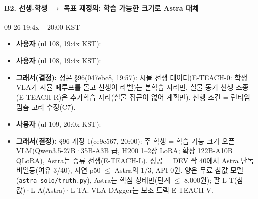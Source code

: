 \paragraph{B2. 선생-학생 $\rightarrow$ 목표 재정의: 학습 가능한 크기로 Astra 대체}
{\small 09-26 19:4x -- 20:00 KST}
\begin{itemize}
  \item \textbf{사용자} (ul 108, 19:4x KST): 
  \item \textbf{사용자} (ul 108, 19:4x KST): 
  \item \textbf{그래서(결정):} 정본 §96(047ebc8, 19:57): 시뮬 선생 데이터(E-TEACH-0: 학생 VLA가 시뮬 폐루프를 몰고 선생이 라벨)는 본학습 자리만, 실물 동기 선생 조종(E-TEACH-R)은 추가학습 자리(실물 접근이 없어 계획만). 선행 조건 = 런타임 멈춤 고리 수정(C7).
  \item \textbf{사용자} (ul 109, 20:0x KST): 
  \item \textbf{그래서(결정):} §96 개정 1(ce9c567, 20:00): 주 학생 = 학습 가능 크기 오픈 VLM(Qwen3.5-27B·35B-A3B 급, H200 1--2장 LoRA; 확장 122B-A10B QLoRA), Astra는 증류 선생(E-TEACH-L). 성공 = DEV 짝 40에서 Astra 단독 비열등(여유 3/40), 지연 p50 $\leq$ Astra의 1/3, API 0원. 양은 무료 참값 모델(\texttt{astra\_\allowbreak{}solo/\allowbreak{}truth.\allowbreak{}py}), Astra는 핵심 상태만(단계 $\leq$ 8,000원); 팔 L-T(참값)·L-A(Astra)·L-TA. VLA DAgger는 보조 트랙 E-TEACH-V.
\end{itemize}

